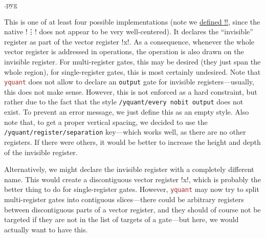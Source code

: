 \documentclass{scrartcl}
\makeatletter
\newenvironment{codeexample}{%
   \VerbatimEnvironment%
   \let\FVB@VerbatimOut\minted@FVB@VerbatimOut
   \let\FVE@VerbatimOut\minted@FVE@VerbatimOut
   \minted@configlang{tex}%
   \minted@fvset
   \begin{VerbatimOut}[codes={\catcode`\^^I=12},firstline,lastline]{\minted@jobname.pyg}%
}{
   \end{VerbatimOut}%
   \minted@langlinenoson%
   \savebox\codeexamplebox{ \minted@jobname.pyg}%
   \ifdim\wd\codeexamplebox>\dimexpr.5\linewidth-3mm\relax%
      \wd\codeexamplebox=.5\linewidth%
   \else%
      \wd\codeexamplebox=\dimexpr\wd\codeexamplebox+3mm\relax%
   \fi%
   \noindent\begin{minipage}{\wd\codeexamplebox}%
      \centering%
      \usebox\codeexamplebox%
   \end{minipage}%
   \begin{minipage}{\dimexpr\linewidth-\wd\codeexamplebox\relax}%
      \expandafter\minted@pygmentize\expandafter{\minted@lang}%
   \end{minipage}%
   \minted@langlinenosoff%
   \par%
}
\def\pkg#1{\textcolor{brown}{\texttt{#1}}}
\def\ttlink{\link\texttt}
\def\Yquant{\pkg{yquant}}
\makeatother
\begin{document}
               \begin{example}
                  \begin{codeexample}
\makeatletter
\DeclareRobustCommand\rvdots{%
   \vbox{%
      \baselineskip4\p@\lineskiplimit\z@%
      \kern-\p@%
      \hbox{.}\hbox{.}\hbox{.}%
   }%
}
                  \end{codeexample}
                  This is one of at least four possible implementations (note we \href{https://tex.stackexchange.com/a/112212/32357}{defined \tex!\rvdots!}, since the native \tex!\vdots! does not appear to be very well\hyp centered).
                  It declares the ``invisible'' register as part of the vector register \yquant!x!.
                  As a consequence, whenever the whole vector register is addressed in operations, the operation is also drawn on the invisible register.
                  For multi\hyp register gates, this may be desired (they just span the whole region), for single\hyp register gates, this is most certainly undesired.
                  Note that \Yquant{} does not allow to declare an \ttlink{output} gate for invisible registers---usually, this does not make sense.
                  However, this is not enforced as a hard constraint, but rather due to the fact that the style \texttt{/yquant/every nobit output} does not exist.
                  To prevent an error message, we just define this as an empty style.
                  Also note that, to get a proper vertical spacing, we decided to use the \ttlink{/yquant/register/separation} key---which works well, as there are no other registers.
                  If there were others, it would be better to increase the height and depth of the invisible register.

                  Alternatively, we might declare the invisible register with a completely different name.
                  This would create a discontiguous vector register \yquant!x!, which is probably the better thing to do for single\hyp register gates.
                  However, \Yquant{} may now try to split multi\hyp register gates into contiguous slices---there could be arbitrary registers between discontiguous parts of a vector register, and they should of course not be targeted if they are not in the list of targets of a gate---but here, we would actually want to have this.


\end{example}
\end{document}
